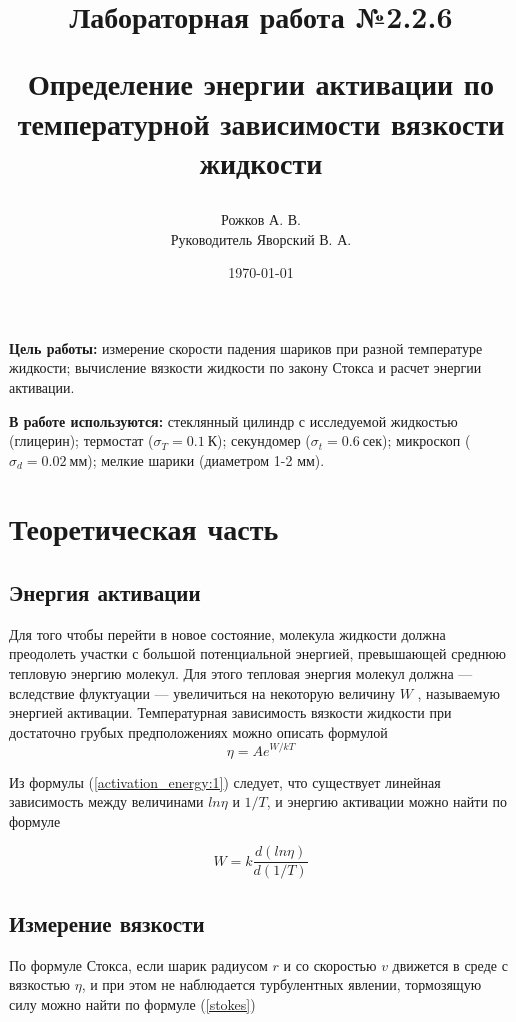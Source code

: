 \documentclass[a4paper, 12pt]{article}
\title{\begin{center}Лабораторная работа №2.2.6\end{center}
Определение энергии активации по температурной зависимости вязкости жидкости}
\author{Рожков А. В. \\ Руководитель Яворский В. А.}
\date{\today}
\begin{document}
    \maketitle
    \newpage


    \textbf{Цель работы:} измерение скорости падения шариков при разной температуре жидкости; вычисление вязкости жидкости по закону Стокса и расчет энергии активации.

    \textbf{В работе используются:} стеклянный цилиндр с исследуемой жидкостью (глицерин); термостат ($\sigma_T = 0.1~К$); секундомер ($\sigma_t = 0.6~сек$); микроскоп ($\sigma_d = 0.02~мм$); мелкие шарики (диаметром 1-2 мм).

    \section{Теоретическая часть}
    \subsection{Энергия активации}
    Для того чтобы перейти в новое состояние, молекула жидкости должна преодолеть участки с большой потенциальной энергией, превышающей среднюю тепловую энергию молекул. Для этого тепловая энергия молекул должна — вследствие флуктуации — увеличиться на некоторую величину $W$ , называемую энергией активации. Температурная зависимость вязкости жидкости при достаточно грубых предположениях можно описать формулой
    \begin{equation} \label{activation_energy:1}
        \eta = A e^{W/kT}
    \end{equation}

    Из формулы (\ref{activation_energy:1}) следует, что существует линейная зависимость между величинами $ln\eta$ и $1/T$, и энергию активации можно найти по формуле

    \begin{equation} \label{activation_energy:2}
        W = k \frac{d(ln\eta)}{d(1/T)}
    \end{equation}

    \subsection{Измерение вязкости}
    По формуле Стокса, если шарик радиусом $r$ и со скоростью $v$ движется в среде с вязкостью $\eta$, и при этом не наблюдается турбулентных явлении, тормозящую силу можно найти по формуле (\ref{stokes})
\end{document}
